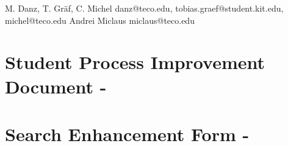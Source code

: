\documentclass{seminar}
\begin{document}
	{M. Danz, T. Gr\"af, C. Michel}
	{danz@teco.edu, tobias.graef@student.kit.edu, michel@teco.edu}
	{Andrei Miclaus}
	{miclaus@teco.edu}


\newpage


\newpage

	
	

\newpage


\newpage

	
	
		
		
		
	
	
	
	
	

\newpage

	
	
		
			
			
			
		
		
	

\newpage


\newpage
\appendix
\section{Student Process Improvement Document - \checklist}

\label{appendix:checklist}
\section{Search Enhancement Form - \briefingform}
\label{appendix:briefingform}

\end{document}
